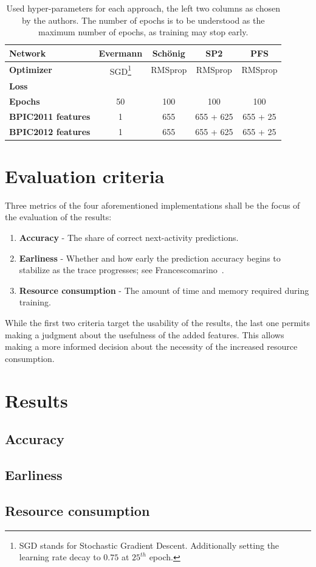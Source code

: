 \begin{table}[ht!]
    \centering
    \begin{tabular}{lcccc}
        \textbf{Network} & Evermann & Schönig & SP2 & PFS\\
        \hline
        \textbf{Optimizer} & SGD\footnote{SGD stands for Stochastic Gradient Descent. Additionally setting the learning rate decay to $0.75$ at $25^{th}$ epoch.} & RMSprop  & RMSprop & RMSprop\\
        \textbf{Loss}    & & & &\\
        \textbf{Epochs}  & 50 & 100 & 100 & 100\\
        \textbf{BPIC2011 features} & 1 & 655 & 655 + 625 & 655 + 25 \\
        \textbf{BPIC2012 features} & 1 & 655 & 655 + 625 & 655 + 25 \\
    \end{tabular}
    \caption{Used hyper-parameters for each approach, the left two columns as chosen by the authors. The number of epochs is to be understood as the maximum number of epochs, as training may stop early.}
    \label{tab:network-info}
\end{table}

\section{Evaluation criteria}
\label{sec:eval:criteria}
Three metrics of the four aforementioned implementations shall be the focus of the evaluation of the results:

\begin{enumerate}
    \item\textbf{Accuracy} - The share of correct next-activity predictions.
    \item\textbf{Earliness} - Whether and how early the prediction accuracy begins to stabilize as the trace progresses; see Francescomarino~\cite{francescomarino2015}.
    \item\textbf{Resource consumption} - The amount of time and memory required during training.
\end{enumerate}

While the first two criteria target the usability of the results, the last one permits making a judgment about the usefulness of the added features. This allows making a more informed decision about the necessity of the increased resource consumption.

\section{Results}
\label{sec:eval:results}


\subsection*{Accuracy}
\subsection*{Earliness}
\subsection*{Resource consumption}

